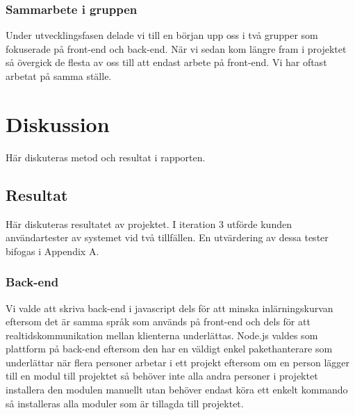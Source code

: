 \documentclass{article}
\begin{document}
\subsubsection{Sammarbete i gruppen}
Under utvecklingsfasen delade vi till en början upp oss i två grupper som fokuserade på front-end och back-end. När vi sedan kom längre fram i projektet så övergick de flesta av oss till att endast arbete på front-end. Vi har oftast arbetat på samma ställe.


\clearpage

\clearpage

\section{Diskussion}
Här diskuteras metod och resultat i rapporten.
\subsection{Resultat}
Här diskuteras resultatet av projektet. I iteration 3 utförde kunden användartester av systemet vid två tillfällen. En utvärdering av dessa tester bifogas i Appendix A.

\subsubsection{Back-end}
Vi valde att skriva back-end i javascript dels för att minska inlärningskurvan eftersom det är samma språk som används på front-end och dels för att realtidskommunikation mellan klienterna underlättas. Node.js valdes som plattform på back-end eftersom den har en väldigt enkel pakethanterare som underlättar när flera personer arbetar i ett projekt eftersom om en person lägger till en modul till projektet så behöver inte alla andra personer i projektet installera den modulen manuellt utan behöver endast köra ett enkelt kommando så installeras alla moduler som är tillagda till projektet.
\end{document}
